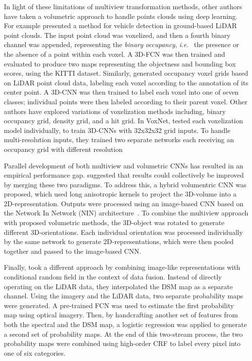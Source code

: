 \documentclass[final,3p,times,twocolumn,authoryear]{elsarticle}
\newcommand{\ie}{\textit{i}.\textit{e}.}
\begin{document}
In light of these limitations of multiview transformation methods, other authors have taken a volumetric approach to handle points clouds using deep learning. 
For example \citet{Bo_Li_iros} presented a method for vehicle detection in ground-based LiDAR point clouds. 
The input point cloud was voxelized, and then a fourth binary channel was appended, representing the \emph{binary occupancy}, \ie~ the presence or the absence of a point within each voxel. 
A 3D-FCN was then trained and evaluated to produce two maps representing the objectness and bounding box scores, using the KITTI dataset. 
Similarly, \citet{huang2016point} generated occupancy voxel grids based on LiDAR point cloud data, labeling each voxel according to the annotation of its center point. 
A 3D-CNN was then trained to label each voxel into one of seven classes; individual points were then labeled according to their parent voxel.  
Other authors have explored variations of voxelization methods including, binary occupancy grid, density grid, and a hit grid.  
In VoxNet, \citet{maturana2015voxnet} tested each voxelization model individually, to train 3D-CNNs with 32x32x32 grid inputs.
To handle multi-resolution inputs, they trained two separate networks each receiving an occupancy grid with different resolution

Parallel development of both multiview and volumetric CNNs has resulted in an empirical performance gap.
\citet{qi2016volumetric} suggested that results could collectively be improved by merging these two paradigms.
To address this, a hybrid volumentric CNN was proposed, which used long anisotropic kernels to project the 3D-volume into a 2D-representation.
Outputs were processed using an image-based CNN based on the Network In Network (NIN) architecture~\citep{NIN}. 
To combine the multiview approach with proposed volumetric methods, the 3D-object was rotated to generate different 3D-orientations. 
Each individual orientation was processed individually by the same network to generate 2D-representations, which were then pooled together and passed to the image-based CNN. 

Finally,  took a different approach by combining image-like representations with conditional random field in the context of data fusion. Instead of directly operating on the LiDAR data, they interpolated the DSM map as a separate channel. 
Using the imagery and the LiDAR data, two separate probability maps were generated. 
A pre-trained FCN was used to estimate the first probability map using optical imagery. 
Then, by handcrafting another set of features from both the spectral and the DSM map, a logistic regression was applied to generate a second set of probability maps. 
At the end of this two-stream process, the two probability maps were combined using high-order CRF to label every pixel into one of six categories.
\end{document}
